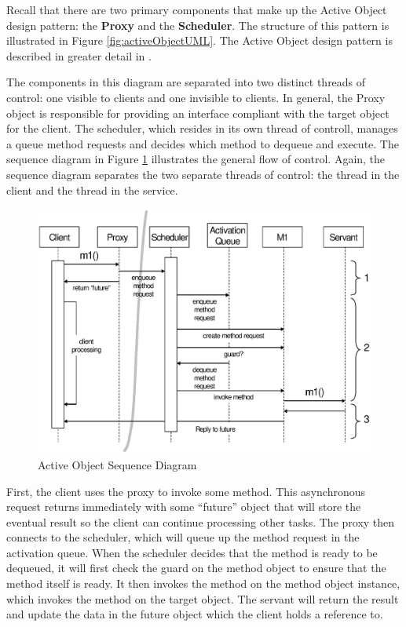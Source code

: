 Recall that there are two primary components that make up the Active Object
design pattern: the \textbf{Proxy} and the \textbf{Scheduler}. The structure of
this pattern is illustrated in Figure \ref{fig:activeObjectUML}. The Active
Object design pattern is described in greater detail in \cite{Schmidt96}.

The components in this diagram are separated into two distinct threads of
control: one visible to clients and one invisible to clients. In general, the
Proxy object is responsible for providing an interface compliant with the target
object for the client. The scheduler, which resides in its own thread of
controll, manages a queue method requests and decides which method to dequeue
and execute. The sequence diagram in Figure \ref{fig:activeObjectSequence}
illustrates the general flow of control. Again, the sequence diagram
separates the two separate threads of control: the thread in the client and the
thread in the service.

\begin{figure}[t]
  \begin{center}
  \includegraphics[width=\textwidth]{images/activeObjectSequence}
  \caption{Active Object Sequence Diagram}
  \label{fig:activeObjectSequence}
  \end{center}
\end{figure}

First, the client uses the proxy to invoke some method. This asynchronous  
request returns immediately with some ``future'' object that will store the
eventual result so the client can continue processing other tasks. The proxy
then connects to the scheduler, which will queue up the method request in the
activation queue. When the scheduler decides that the method is ready to be
dequeued, it will first check the guard on the method object to ensure that the
method itself is ready. It then invokes the method on the method object
instance, which invokes the method on the target object. The servant will return
the result and update the data in the future object which the client holds a
reference to.

